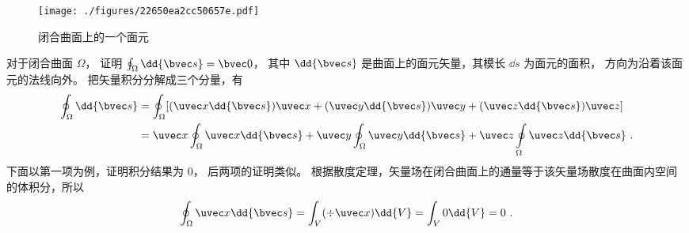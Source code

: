 



\begin{figure}[ht]
\centering
\texttt{[image: ./figures/22650ea2cc50657e.pdf]}
\caption{闭合曲面上的一个面元} \label{fig_CSI0_1}
\end{figure}

对于闭合曲面 $\Omega$，  证明 $\oint_\Omega  \dd{\bvec s} = \bvec 0$， 其中 $\dd{\bvec s}$ 是曲面上的面元矢量，其模长 $\dd{s}$ 为面元的面积，  方向为沿着该面元的法线向外。
把矢量积分分解成三个分量，有
\begin{equation}
\begin{aligned}
\oint_\Omega  \dd{\bvec s} & = \oint_\Omega  [(\uvec x \dd{\bvec s})\uvec x + (\uvec y \dd{\bvec s})\uvec y + (\uvec z \dd{\bvec s})\uvec z] \\
&= \uvec x\oint_\Omega  \uvec x \dd{\bvec s}  + \uvec y\oint_\Omega \uvec y \dd{\bvec s} + \uvec z\oint\limits_\Omega \uvec z \dd{\bvec s}~.
\end{aligned}
\end{equation}
下面以第一项为例，证明积分结果为 0， 后两项的证明类似。
根据散度定理，矢量场在闭合曲面上的通量等于该矢量场散度在曲面内空间的体积分，所以
\begin{equation}
\oint_\Omega  \uvec x \dd{\bvec s}  = \int_V (\div \uvec x) \dd{V}  = \int_V 0 \dd{V}  = 0~.
\end{equation}
